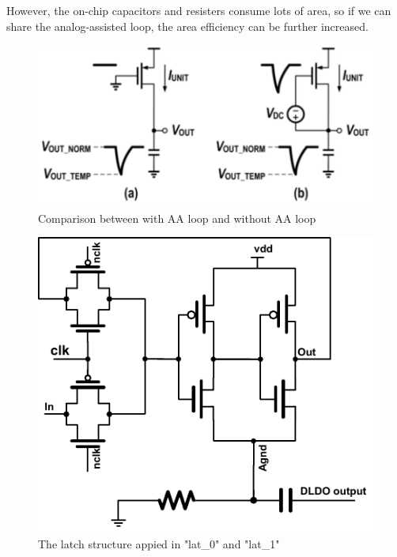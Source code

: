 \documentclass[journal]{IEEEtran}
\begin{document}
However, the on-chip capacitors and resisters consume lots of area, so if we can share the analog-assisted loop, the area efficiency can be further increased.
\begin{figure}[t!]
    \centering
    \includegraphics[width=\linewidth]{pic/struc/aaloop.pdf}
    \caption{Comparison between with AA loop and without AA loop}
    \label{fig:aaloop}
\end{figure}
\begin{figure}[t!]
    \centering
    \includegraphics[width=0.9\linewidth]{pic/struc/latch.pdf}
    \caption{The latch structure appied in "lat\_0" and "lat\_1"}
    \label{fig:latch}
\end{figure}




\end{document}
